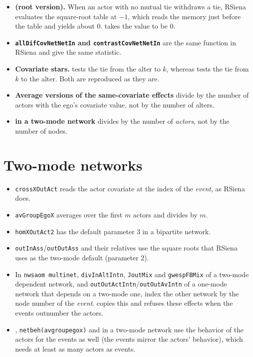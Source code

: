 \begin{itemize}
\item \textbf{ (root version).} When an actor with no mutual tie
  withdraws a tie, RSiena evaluates the square-root table at $-1$, which reads
  the memory just before the table and yields about 0. \nwsaom{} takes the value
  to be 0.
\item \textbf{\texttt{allDifCovNetNetIn} and \texttt{contrastCovNetNetIn}} are
  the same function in RSiena and give the same statistic.
\item \textbf{Covariate stars.}  tests the tie
  from the alter to $k$, whereas  tests the tie from
  $k$ to the alter. Both are reproduced as they are.
\item \textbf{Average versions of the same-covariate effects} divide by the number
  of actors with the ego's covariate value, not by the number of alters.
\item \textbf{ in a two-mode network} divides by the number of
  \emph{actors}, not by the number of nodes.
\end{itemize}

\section*{Two-mode networks}

\begin{itemize}
\item \texttt{crossXOutAct} reads the actor covariate at the index of the
  \emph{event}, as RSiena does.
\item \texttt{avGroupEgoX} averages over the first $m$ actors and divides by
  $m$.
\item \texttt{homXOutAct2} has the default parameter 3 in a bipartite network.
\item \texttt{outInAss}/\texttt{outOutAss} and their relatives use the square
  roots that RSiena uses as the two-mode default (parameter 2).
\item In \texttt{nwsaom multinet}, \texttt{divInAltIntn}, \texttt{JoutMix} and
  \texttt{gwespFBMix} of a two-mode dependent network, and
  \texttt{outOutActIntn}/\texttt{outOutAvIntn} of a one-mode network that depends on a
  two-mode one, index the other network by the node number of the \emph{event}. \nwsaom{}
  copies this and refuses these effects when the events outnumber the actors.
\item {}, \texttt{netbeh(avgroupegox)} and
   in a two-mode network use the behavior of the actors for
  the events as well (the events mirror the actors' behavior), which needs at least as many actors
  as events.
\end{itemize}

